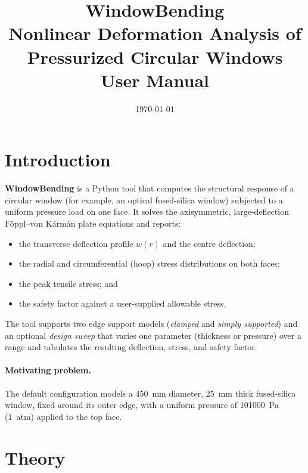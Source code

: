 \documentclass[11pt]{article}
\title{\textbf{WindowBending}\\[4pt]
\large Nonlinear Deformation Analysis of Pressurized Circular Windows\\[6pt]
\normalsize User Manual}
\author{}
\date{\today}
\begin{document}
\maketitle
\tableofcontents
\newpage

\section{Introduction}

\textbf{WindowBending} is a Python tool that computes the structural response
of a circular window (for example, an optical fused-silica window) subjected to
a uniform pressure load on one face. It solves the axisymmetric, large-deflection
F\"oppl--von K\'arm\'an plate equations and reports:

\begin{itemize}[noitemsep]
  \item the transverse deflection profile $w(r)$ and the centre deflection;
  \item the radial and circumferential (hoop) stress distributions on both faces;
  \item the peak tensile stress; and
  \item the safety factor against a user-supplied allowable stress.
\end{itemize}

The tool supports two edge support models (\emph{clamped} and
\emph{simply supported}) and an optional \emph{design sweep} that varies one
parameter (thickness or pressure) over a range and tabulates the resulting
deflection, stress, and safety factor.

\paragraph{Motivating problem.} The default configuration models a
\qty{450}{\milli\meter} diameter, \qty{25}{\milli\meter} thick fused-silica window,
fixed around its outer edge, with a uniform pressure of
\qty{101000}{\pascal} (1~atm) applied to the top face.

\section{Theory}
\end{document}
